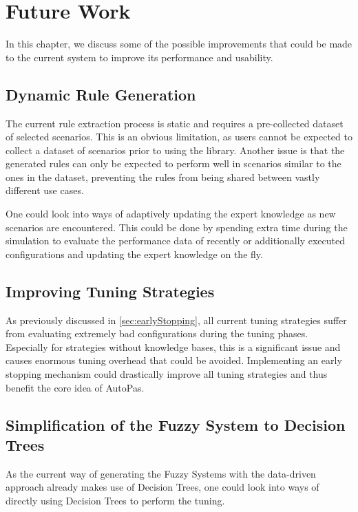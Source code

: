 \chapter{Future Work}
\label{sec:future_work}

In this chapter, we discuss some of the possible improvements that could be made to the current system to improve its performance and usability.

\section{Dynamic Rule Generation}

The current rule extraction process is static and requires a pre-collected dataset of selected scenarios. This is an obvious limitation, as users cannot be expected to collect a dataset of scenarios prior to using the library. Another issue is that the generated rules can only be expected to perform well in scenarios similar to the ones in the dataset, preventing the rules from being shared between vastly different use cases.

One could look into ways of adaptively updating the expert knowledge as new scenarios are encountered. This could be done by spending extra time during the simulation to evaluate the performance data of recently or additionally executed configurations and updating the expert knowledge on the fly.
\section{Improving Tuning Strategies}

As previously discussed in \autoref{sec:earlyStopping}, all current tuning strategies suffer from evaluating extremely bad configurations during the tuning phases. Especially for strategies without knowledge bases, this is a significant issue and causes enormous tuning overhead that could be avoided. Implementing an early stopping mechanism could drastically improve all tuning strategies and thus benefit the core idea of AutoPas.

\section{Simplification of the Fuzzy System to Decision Trees}

As the current way of generating the Fuzzy Systems with the data-driven approach already makes use of Decision Trees, one could look into ways of directly using Decision Trees to perform the tuning.


